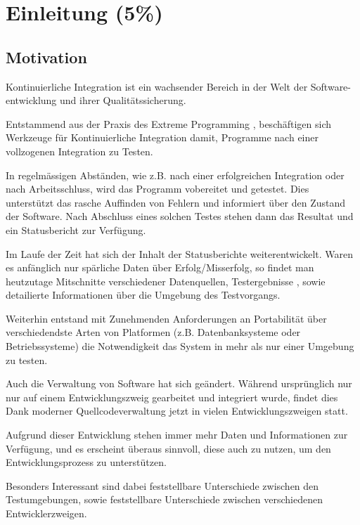 \chapter{Einleitung (5\%) }

\section{Motivation}

Kontinuierliche Integration ist ein wachsender Bereich
in der Welt der Software-entwicklung und ihrer Qualit\"atssicherung.

Entstammend aus der Praxis des Extreme Programming
\cite{xp:explained} \cite{folwer:xp},
besch\"aftigen sich Werkzeuge f\"ur Kontinuierliche Integration damit,
Programme nach einer vollzogenen Integration zu Testen.

In regelm\"assigen Abst\"anden, wie z.B. nach einer erfolgreichen Integration oder nach Arbeitsschluss,
wird das Programm vobereitet und getestet.
Dies unterst\"utzt das rasche Auffinden von Fehlern
und informiert \"uber den Zustand der Software.
Nach Abschluss eines solchen Testes stehen dann das Resultat
und ein Statusbericht zur Verf\"ugung.

Im Laufe der Zeit hat sich der Inhalt der Statusberichte weiterentwickelt.
Waren es anf\"anglich nur sp\"arliche Daten \"uber Erfolg/Misserfolg,
so findet man heutzutage Mitschnitte verschiedener Datenquellen, Testergebnisse
\cite{jenkins:junitxml}, sowie detailierte Informationen \"uber die Umgebung des Testvorgangs.

Weiterhin entstand mit Zunehmenden Anforderungen an Portabilit\"at \"uber
verschiedendste Arten von Platformen (z.B. Datenbanksysteme oder Betriebssysteme)
die Notwendigkeit das System in mehr als nur einer Umgebung zu testen.

Auch die Verwaltung von Software hat sich ge\"andert.
W\"ahrend urspr\"unglich nur nur auf einem Entwicklungszweig gearbeitet und integriert wurde,
findet dies Dank moderner Quellcodeverwaltung jetzt in vielen Entwicklungszweigen statt.
\cite{dvcs:vorteile} \cite{dvcs:entwicklungsmodelle}

Aufgrund dieser Entwicklung stehen immer mehr Daten und Informationen zur Verf\"ugung,
und es erscheint \"uberaus sinnvoll, diese auch zu nutzen, um den Entwicklungsprozess zu unterst\"utzen.

Besonders Interessant sind dabei feststellbare Unterschiede zwischen den Testumgebungen,
sowie feststellbare Unterschiede zwischen verschiedenen Entwicklerzweigen.

